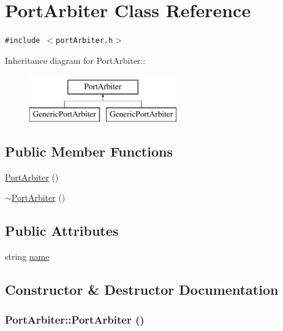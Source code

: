 \hypertarget{classPortArbiter}{
\section{PortArbiter Class Reference}
\label{classPortArbiter}
}
{\tt \#include $<$portArbiter.h$>$}

Inheritance diagram for PortArbiter::\begin{figure}[H]
\begin{center}
\leavevmode
\includegraphics[height=2cm]{classPortArbiter}
\end{center}
\end{figure}
\subsection*{Public Member Functions}
\begin{CompactItemize}
\item 
\hyperlink{classPortArbiter_4c3557fe1dda9d5861d2d21b3698e67c}{PortArbiter} ()
\item 
\hyperlink{classPortArbiter_96aa09e1d40630906ffe56fbca7cd984}{$\sim$PortArbiter} ()
\end{CompactItemize}
\subsection*{Public Attributes}
\begin{CompactItemize}
\item 
string \hyperlink{classPortArbiter_0a44c855daa1f7b41013a5c09ab27f95}{name}
\end{CompactItemize}


\subsection{Constructor \& Destructor Documentation}
\hypertarget{classPortArbiter_4c3557fe1dda9d5861d2d21b3698e67c}{
\subsubsection[{PortArbiter}]{\setlength{\rightskip}{0pt plus 5cm}PortArbiter::PortArbiter ()}}
\label{classPortArbiter_4c3557fe1dda9d5861d2d21b3698e67c}


